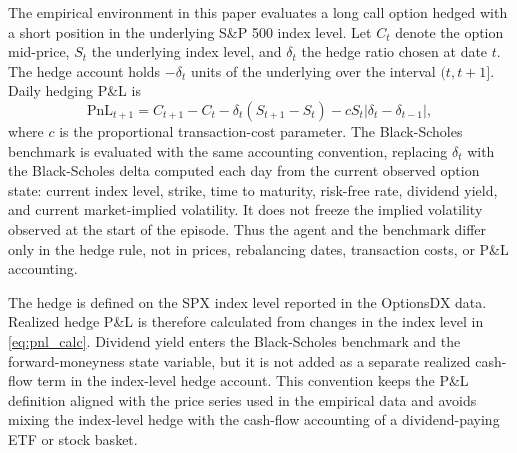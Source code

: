 \documentclass[a4paper,12pt]{article}
\numberwithin{equation}{section}
\begin{document}
The empirical environment in this paper evaluates a long call option hedged with a short position in the underlying S\&P 500 index level. Let $C_t$ denote the option mid-price, $S_t$ the underlying index level, and $\delta_t$ the hedge ratio chosen at date $t$. The hedge account holds $-\delta_t$ units of the underlying over the interval $(t,t+1]$. Daily hedging P\&L is
\begin{equation}
    \mathrm{PnL}_{t+1}
    =
    C_{t+1}-C_t
    -
    \delta_t(S_{t+1}-S_t)
    -
    cS_t|\delta_t-\delta_{t-1}|,
    \label{eq:pnl_calc}
\end{equation}
where $c$ is the proportional transaction-cost parameter. The Black-Scholes benchmark is evaluated with the same accounting convention, replacing $\delta_t$ with the Black-Scholes delta computed each day from the current observed option state: current index level, strike, time to maturity, risk-free rate, dividend yield, and current market-implied volatility. It does not freeze the implied volatility observed at the start of the episode. Thus the agent and the benchmark differ only in the hedge rule, not in prices, rebalancing dates, transaction costs, or P\&L accounting.

The hedge is defined on the SPX index level reported in the OptionsDX data. Realized hedge P\&L is therefore calculated from changes in the index level in \eqref{eq:pnl_calc}. Dividend yield enters the Black-Scholes benchmark and the forward-moneyness state variable, but it is not added as a separate realized cash-flow term in the index-level hedge account. This convention keeps the P\&L definition aligned with the price series used in the empirical data and avoids mixing the index-level hedge with the cash-flow accounting of a dividend-paying ETF or stock basket.
\end{document}
